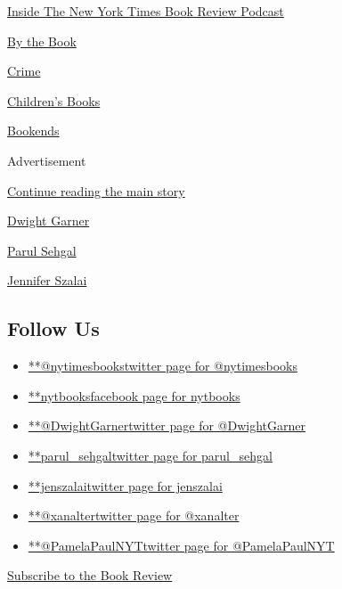 \href{https://www.nytimes3xbfgragh.onion/column/book-review-podcast}{Inside
The New York Times Book Review Podcast}

\href{https://www.nytimes3xbfgragh.onion/column/by-the-book}{By the
Book}

\href{https://www.nytimes3xbfgragh.onion/column/crime}{Crime}

\href{https://www.nytimes3xbfgragh.onion/column/childrens-books}{Children's
Books}

\href{https://www.nytimes3xbfgragh.onion/column/bookends}{Bookends}

Advertisement

\protect\hyperlink{after-mktg}{Continue reading the main story}

\href{https://www.nytimes3xbfgragh.onion/by/dwight-garner}{Dwight
Garner}

\href{https://www.nytimes3xbfgragh.onion/by/parul-sehgal}{Parul Sehgal}

\href{https://www.nytimes3xbfgragh.onion/by/jennifer-szalai}{Jennifer
Szalai}

\hypertarget{follow-us}{%
\subsection{Follow Us}\label{follow-us}}

\begin{itemize}
\tightlist
\item
  \href{https://twitter.com/nytimesbooks}{**@nytimesbookstwitter page
  for @nytimesbooks}
\item
  \href{https://www.facebookcorewwwi.onion/nytbooks}{**nytbooksfacebook
  page for nytbooks}
\item
  \href{https://twitter.com/DwightGarner}{**@DwightGarnertwitter page
  for @DwightGarner}
\item
  \href{https://twitter.com/parul_sehgal}{**parul\_sehgaltwitter page
  for parul\_sehgal}
\item
  \href{https://twitter.com/jenszalai}{**jenszalaitwitter page for
  jenszalai}
\item
  \href{https://twitter.com/xanalter}{**@xanaltertwitter page for
  @xanalter}
\item
  \href{https://twitter.com/PamelaPaulNYT}{**@PamelaPaulNYTtwitter page
  for @PamelaPaulNYT}
\end{itemize}

\href{https://homedelivery.nytimes3xbfgragh.onion/HDS/BookReviewHome.do?mode=BookReviewHome\&ref=review}{Subscribe
to the Book Review}

